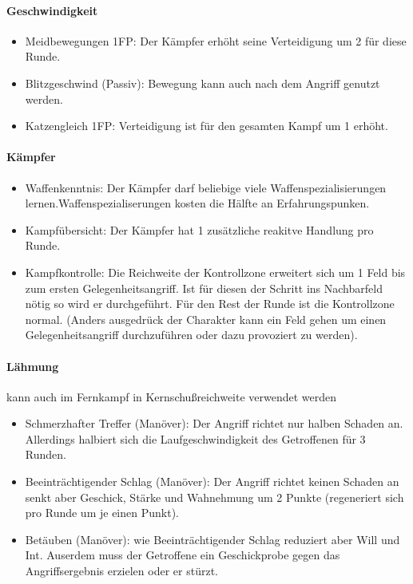 \documentclass{article}
\begin{document}
\paragraph{Geschwindigkeit}

\begin{itemize}
\item Meidbewegungen 1FP: Der Kämpfer erhöht seine Verteidigung um 2 für diese Runde.
\item Blitzgeschwind (Passiv): Bewegung kann auch nach dem Angriff genutzt werden.
\item Katzengleich 1FP: Verteidigung ist für den gesamten Kampf um 1 erhöht.
\end{itemize}

\paragraph{Kämpfer}

\begin{itemize}
\item Waffenkenntnis: Der Kämpfer darf beliebige viele Waffenspezialisierungen lernen.Waffenspezialiserungen kosten die Hälfte an Erfahrungspunken.
\item Kampfübersicht: Der Kämpfer hat 1 zusätzliche reakitve Handlung pro Runde.
\item Kampfkontrolle: Die Reichweite der Kontrollzone erweitert sich um 1 Feld bis zum ersten Gelegenheitsangriff. Ist für diesen der Schritt ins Nachbarfeld nötig so wird er durchgeführt. Für den Rest der Runde ist die Kontrollzone normal. (Anders ausgedrück der Charakter kann ein Feld gehen um einen Gelegenheitsangriff durchzuführen oder dazu provoziert zu werden).
\end{itemize}

\paragraph{Lähmung }
kann auch im Fernkampf in Kernschußreichweite verwendet werden

\begin{itemize}
\item Schmerzhafter Treffer (Manöver): Der Angriff richtet nur halben Schaden an. Allerdings halbiert sich die Laufgeschwindigkeit des Getroffenen für 3 Runden.
\item Beeinträchtigender Schlag (Manöver): Der Angriff richtet keinen Schaden an senkt aber Geschick, Stärke und Wahnehmung um 2 Punkte (regeneriert sich pro Runde um je einen Punkt).
\item Betäuben (Manöver): wie Beeinträchtigender Schlag reduziert aber Will und Int. Auserdem muss der Getroffene ein Geschickprobe gegen das Angriffsergebnis erzielen oder er stürzt.
\end{itemize}
\end{document}
